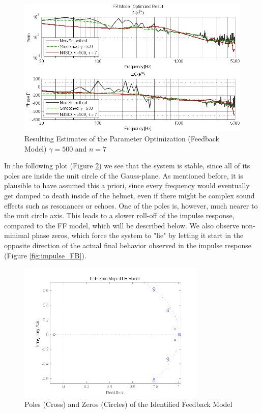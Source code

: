 \begin{figure}[h]
\centering
\includegraphics[width=1.0\textwidth]{pics/results_FB}
\caption{Resulting Estimates of the Parameter Optimization (Feedback Model) $\gamma = 500$ and $n = 7$}
\label{fig:results_FB}
\end{figure}

In the following plot (Figure \ref{fig:pole_FB}) we see that the system is stable, since all of its poles are inside the unit circle of the Gauss-plane. As mentioned before, it is plausible to have assumed this a priori, since every frequency would eventually get damped to death inside of the helmet, even if there might be complex sound effects such as resonances or echoes. One of the poles is, however, much nearer to the unit circle axis. This leads to a slower roll-off of the impulse response, compared to the FF model, which will be described below. We also observe non-minimal phase zeros, which force the system to "lie" by letting it start in the opposite direction of the actual final behavior observed in the impulse response (Figure \ref{fig:impulse_FB}).\\

\begin{figure}[h]
\centering
\includegraphics[width=0.8\textwidth]{pics/pole_FB}
\caption{Poles (Cross) and Zeros (Circles) of the Identified Feedback Model}
\label{fig:pole_FB}
\end{figure}

